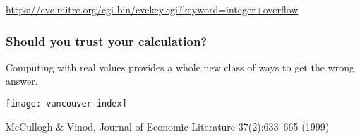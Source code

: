 \documentclass[presentation]{beamer}
\begin{document}
\begin{frame}[plain,t]
  \begin{flushright}
    \tiny \url{https://cve.mitre.org/cgi-bin/cvekey.cgi?keyword=integer+overflow}
  \end{flushright}
\end{frame}

\begin{frame}
  \frametitle{Should you trust your calculation?}

  Computing with real values provides a whole new class of ways to get
  the wrong answer.

  \begin{center}
    \texttt{[image: vancouver-index]}
  \end{center}
  \begin{flushright}
    \tiny McCullogh \& Vinod, Journal of Economic Literature
    37(2):633--665 (1999)
  \end{flushright}
\end{frame}
\end{document}

